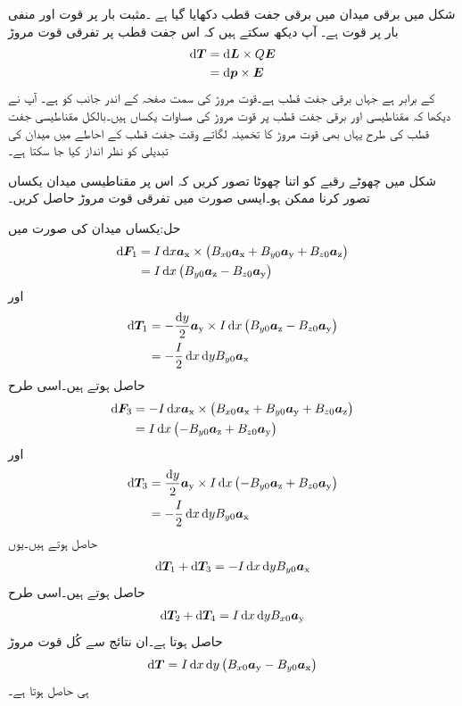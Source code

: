 شکل  میں برقی میدان میں برقی جفت قطب دکھایا گیا ہے ۔مثبت بار پر قوت  اور منفی بار پر قوت    ہے۔ آپ دیکھ سکتے ہیں کہ اس جفت قطب پر  تفرقی قوت مروڑ
\begin{align*}
\dif \kvec{T}&=\dif \kvec{L} \times Q \kvec{E}\\
&=\dif \kvec{p} \times \kvec{E}
\end{align*}
کے برابر ہے جہاں  برقی جفت قطب ہے۔قوت مروڑ کی سمت صفحہ کے اندر جانب کو ہے۔ آپ نے دیکھا کہ مقناطیسی اور برقی جفت قطب پر قوت مروڑ کی مساوات یکساں ہیں۔بالکل مقناطیسی جفت قطب کی طرح یہاں بھی قوت مروڑ کا تخمینہ لگاتے وقت جفت قطب کے احاطے میں میدان  کی تبدیلی کو نظر انداز کیا جا سکتا ہے۔

شکل  میں چھوٹے رقبے کو اتنا چھوٹا تصور کریں کہ اس پر مقناطیسی میدان یکساں تصور کرنا ممکن ہو۔ایسی صورت میں تفرقی قوت مروڑ حاصل کریں۔

حل:یکساں میدان کی صورت میں
\begin{align*}
\dif \kvec{F}_1&=I \dif x \ax \times \left(B_{x0} \ax+B_{y0}\ay+B_{z0}\az\right)\\
&=I \dif x \left(B_{y0}\az-B_{z0}\ay \right)
\end{align*}
اور
\begin{align*}
\dif \kvec{T}_1&=-\frac{\dif y}{2}\ay \times I \dif x \left(B_{y0}\az-B_{z0}\ay \right)\\
&=-\frac{I}{2} \dif x \dif y B_{y0}\ax
\end{align*}
حاصل ہوتے ہیں۔اسی طرح
\begin{align*}
\dif \kvec{F}_3&=-I \dif x \ax \times \left(B_{x0} \ax+B_{y0}\ay+B_{z0}\az\right)\\
&=I \dif x \left(-B_{y0}\az+B_{z0}\ay \right)
\end{align*}
اور
\begin{align*}
\dif \kvec{T}_3&=\frac{\dif y}{2}\ay \times I \dif x \left(-B_{y0}\az+B_{z0}\ay \right)\\
&=-\frac{I}{2} \dif x \dif y B_{y0}\ax
\end{align*}
حاصل ہوتے ہیں۔یوں
\begin{align*}
\dif \kvec{T}_1+\dif \kvec{T}_3=-I \dif x \dif y B_{y0}\ax
\end{align*}
حاصل ہوتے ہیں۔اسی طرح
\begin{align*}
\dif \kvec{T}_2+\dif \kvec{T}_4=I\dif x \dif y  B_{x0}\ay
\end{align*}
حاصل ہوتا ہے۔ان نتائج سے کُل قوت مروڑ
\begin{align*}
\dif \kvec{T}=I \dif x \dif y  \left(B_{x0}\ay -B_{y0}\ax\right) 
\end{align*}
ہی حاصل ہوتا ہے۔

